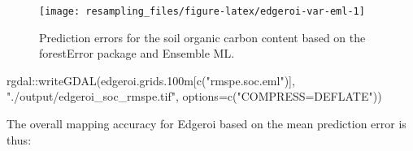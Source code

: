 \documentclass[
  graybox,natbib,nospthms]{svmono}
\newenvironment{Shaded}{\begin{snugshade}}{\end{snugshade}}
\newcommand{\AttributeTok}[1]{\textcolor[rgb]{0.61,0.61,0.61}{#1}}
\newcommand{\CommentTok}[1]{\textcolor[rgb]{0.37,0.37,0.37}{\textit{#1}}}
\newcommand{\ConstantTok}[1]{\textcolor[rgb]{0,0,0}{#1}}
\newcommand{\DecValTok}[1]{\textcolor[rgb]{0.06,0.06,0.06}{#1}}
\newcommand{\FloatTok}[1]{\textcolor[rgb]{0.06,0.06,0.06}{#1}}
\newcommand{\FunctionTok}[1]{\textcolor[rgb]{0,0,0}{#1}}
\newcommand{\NormalTok}[1]{#1}
\newcommand{\OtherTok}[1]{\textcolor[rgb]{0.37,0.37,0.37}{#1}}
\newcommand{\SpecialCharTok}[1]{\textcolor[rgb]{0,0,0}{#1}}
\newcommand{\StringTok}[1]{\textcolor[rgb]{0.5,0.5,0.5}{#1}}
\begin{document}
\begin{Shaded}
\end{Shaded}

\begin{figure}

{\centering \texttt{[image: resampling\_files/figure-latex/edgeroi-var-eml-1]} 

}

\caption{Prediction errors for the soil organic carbon content based on the forestError package and Ensemble ML.}\label{fig:edgeroi-var-eml}
\end{figure}

\begin{Shaded}
\begin{Highlighting}[]
\NormalTok{rgdal}\SpecialCharTok{::}\FunctionTok{writeGDAL}\NormalTok{(edgeroi.grids}\FloatTok{.100}\NormalTok{m[}\FunctionTok{c}\NormalTok{(}\StringTok{"rmspe.soc.eml"}\NormalTok{)], }
                 \StringTok{"./output/edgeroi\_soc\_rmspe.tif"}\NormalTok{, }
                 \AttributeTok{options=}\FunctionTok{c}\NormalTok{(}\StringTok{"COMPRESS=DEFLATE"}\NormalTok{))}
\end{Highlighting}
\end{Shaded}

The overall mapping accuracy for Edgeroi based on the mean prediction error is thus:

\begin{Shaded}
\end{Shaded}
\end{document}
